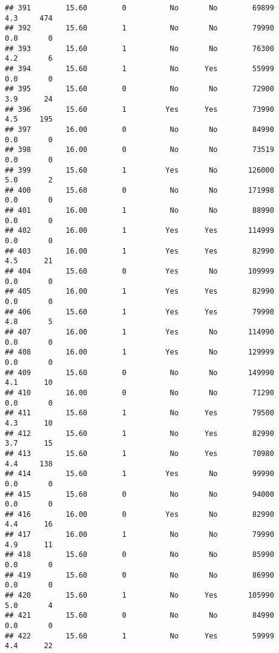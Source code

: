 \documentclass[
]{article}
\begin{document}
\begin{verbatim}
## 391        15.60        0          No       No        69899         4.3     474
## 392        15.60        1          No       No        79990         0.0       0
## 393        15.60        1          No       No        76300         4.2       6
## 394        15.60        1          No      Yes        55999         0.0       0
## 395        15.60        0          No       No        72900         3.9      24
## 396        15.60        1         Yes      Yes        73990         4.5     195
## 397        16.00        0          No       No        84990         0.0       0
## 398        16.00        0          No       No        73519         0.0       0
## 399        15.60        1         Yes       No       126000         5.0       2
## 400        15.60        0          No       No       171998         0.0       0
## 401        16.00        1          No       No        88990         0.0       0
## 402        16.00        1         Yes      Yes       114999         0.0       0
## 403        16.00        1         Yes      Yes        82990         4.5      21
## 404        15.60        0         Yes       No       109999         0.0       0
## 405        16.00        1         Yes      Yes        82990         0.0       0
## 406        15.60        1         Yes      Yes        79990         4.8       5
## 407        16.00        1         Yes       No       114990         0.0       0
## 408        16.00        1         Yes       No       129999         0.0       0
## 409        15.60        0          No       No       149990         4.1      10
## 410        16.00        0          No       No        71290         0.0       0
## 411        15.60        1          No      Yes        79500         4.3      10
## 412        15.60        1          No      Yes        82990         3.7      15
## 413        15.60        1          No      Yes        70980         4.4     138
## 414        15.60        1         Yes       No        99990         0.0       0
## 415        15.60        0          No       No        94000         0.0       0
## 416        16.00        0         Yes       No        82990         4.4      16
## 417        16.00        1          No       No        79990         4.9      11
## 418        15.60        0          No       No        85990         0.0       0
## 419        15.60        0          No       No        86990         0.0       0
## 420        15.60        1          No      Yes       105990         5.0       4
## 421        15.60        0          No       No        84990         0.0       0
## 422        15.60        1          No      Yes        59999         4.4      22

\end{verbatim}
\end{document}
